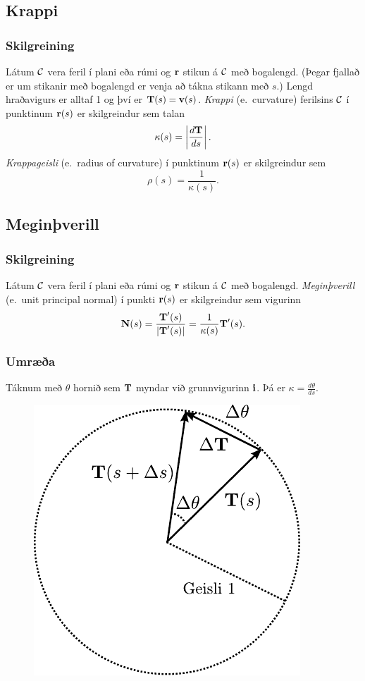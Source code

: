 \subsection{Krappi}
 \subsubsection{Skilgreining }
   Látum $\cal C$ vera feril í plani eða rúmi og
$\mbox{${\bf r}$}$ stikun á $\cal C$ með bogalengd.  (Þegar fjallað er um stikanir
með bogalengd er venja að tákna stikann með $s$.) Lengd hraðavigurs
 er alltaf 1 og
því er $\mbox{${\bf T}$}(s)=\mbox{${\bf v}$}(s)$.   {\em Krappi} (e.~curvature) ferilsins $\cal
C$ í punktinum $\mbox{${\bf r}$}(s)$ er skilgreindur sem talan 
$$\kappa(s)=\left|\frac{d\mbox{${\bf T}$}}{ds}\right|.$$
{\em Krappageisli} (e.~radius of curvature) í punktinum $\mbox{${\bf r}$}(s)$ er
skilgreindur sem  
$$\rho(s)=\frac{1}{\kappa(s)}.$$
 



\subsection{Meginþverill}
 \subsubsection{Skilgreining }
   Látum $\cal C$ vera feril í plani eða rúmi og $\mbox{${\bf r}$}$ stikun á $\cal C$ með bogalengd.  {\em Meginþverill} (e.~unit principal normal) í punkti $\mbox{${\bf r}$}(s)$ er skilgreindur sem vigurinn 
$$\mbox{${\bf N}$}(s)=\frac{\mbox{${\bf T}$}'(s)}{|\mbox{${\bf T}$}'(s)|}=\frac{1}{\kappa(s)}\mbox{${\bf T}$}'(s).$$
 


 \subsubsection{Umræða}
  Táknum með $\theta$ hornið sem $\mbox{${\bf T}$}$ myndar við grunnvigurinn $\mbox{${\bf i}$}$. Þá er $\kappa = \frac{d\theta}{ds}$.
 
\begin{figure}[h]
\begin{center} 
\includegraphics{krappi} 
\caption*{ } 
\end{center}
\end{figure}  


